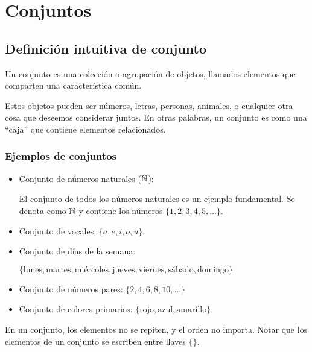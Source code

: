 \section{Conjuntos} \label{sec:conjuntos}


\subsection{Definición intuitiva de conjunto}
\vspace{1em}
\begin{fmd-definition}[Conjunto]
	Un \gls{conjunto} es una colección o agrupación de objetos, llamados \glspl{elemento} que comparten una característica común.
\end{fmd-definition}

Estos objetos pueden ser números, letras, personas, animales, o cualquier otra cosa que deseemos considerar juntos. En otras palabras, un conjunto es como una ``caja'' que contiene elementos relacionados.

\subsubsection{Ejemplos de conjuntos}

\begin{itemize}
	\item Conjunto de números naturales ($\mathbb{N}$):
	
	El conjunto de todos los números naturales es un ejemplo fundamental. Se denota como $\mathbb{N}$ y contiene los números $\{ 1, 2, 3, 4, 5, \ldots \}$.
	
	\item Conjunto de vocales: $\{a, e, i, o, u\}$.
	
	\item Conjunto de días de la semana:
	
	$\{ \text{lunes}, \text{martes}, \text{miércoles}, \text{jueves}, \text{viernes}, \text{sábado}, \text{domingo} \}$
	
	\item Conjunto de números pares: $\{2, 4, 6, 8, 10, \ldots \}$
	
	\item Conjunto de colores primarios: $\{\text{rojo}, \text{azul}, \text{amarillo}\}$.
\end{itemize}

En un conjunto, los elementos no se repiten, y el orden no importa. Notar que los elementos de un conjunto se escriben entre llaves $\{ \}$.

